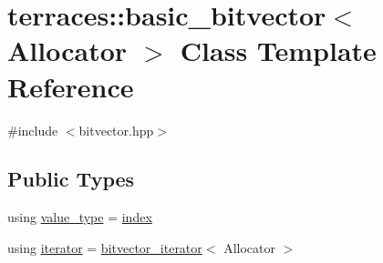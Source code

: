 \hypertarget{classterraces_1_1basic__bitvector}{}\section{terraces\+:\+:basic\+\_\+bitvector$<$ Allocator $>$ Class Template Reference}
\label{classterraces_1_1basic__bitvector}


{\ttfamily \#include $<$bitvector.\+hpp$>$}

\subsection*{Public Types}
\begin{DoxyCompactItemize}
\item 
using \hyperlink{classterraces_1_1basic__bitvector_ad076eceb68c15a18925cd409e6eaac11}{value\+\_\+type} = \hyperlink{namespaceterraces_adbc33ccb543d1634e96d0eb02e472c77}{index}
\item 
using \hyperlink{classterraces_1_1basic__bitvector_aff8b2ad5a1518f6d8b157df0d2f77bdd}{iterator} = \hyperlink{classterraces_1_1bitvector__iterator}{bitvector\+\_\+iterator}$<$ Allocator $>$
\end{DoxyCompactItemize}
